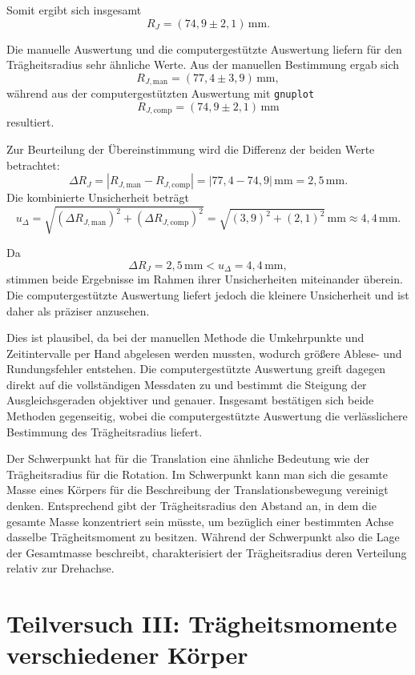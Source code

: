 \documentclass{report}
\begin{document}
\noindent
Somit ergibt sich insgesamt
\[
\boxed{R_J=(74{,}9\pm2{,}1)\,\mathrm{mm}.}
\]

\noindent
Die manuelle Auswertung und die computergestützte Auswertung liefern für den Trägheitsradius sehr ähnliche Werte. Aus der manuellen Bestimmung ergab sich
\[
R_{J,\mathrm{man}}=(77{,}4\pm3{,}9)\,\mathrm{mm},
\]
während aus der computergestützten Auswertung mit \texttt{gnuplot}
\[
R_{J,\mathrm{comp}}=(74{,}9\pm2{,}1)\,\mathrm{mm}
\]
resultiert.

\noindent
Zur Beurteilung der Übereinstimmung wird die Differenz der beiden Werte betrachtet:
\[
\Delta R_J=\left|R_{J,\mathrm{man}}-R_{J,\mathrm{comp}}\right|
=|77{,}4-74{,}9|\,\mathrm{mm}
=2{,}5\,\mathrm{mm}.
\]
Die kombinierte Unsicherheit beträgt
\[
u_{\Delta}=
\sqrt{(\Delta R_{J,\mathrm{man}})^2+(\Delta R_{J,\mathrm{comp}})^2}
=
\sqrt{(3{,}9)^2+(2{,}1)^2}\,\mathrm{mm}
\approx 4{,}4\,\mathrm{mm}.
\]

\noindent
Da
\[
\Delta R_J = 2{,}5\,\mathrm{mm} < u_{\Delta} = 4{,}4\,\mathrm{mm},
\]
stimmen beide Ergebnisse im Rahmen ihrer Unsicherheiten miteinander überein. Die computergestützte Auswertung liefert jedoch die kleinere Unsicherheit und ist daher als präziser anzusehen.

\noindent
Dies ist plausibel, da bei der manuellen Methode die Umkehrpunkte und Zeitintervalle per Hand abgelesen werden mussten, wodurch größere Ablese- und Rundungsfehler entstehen. Die computergestützte Auswertung greift dagegen direkt auf die vollständigen Messdaten zu und bestimmt die Steigung der Ausgleichsgeraden objektiver und genauer. Insgesamt bestätigen sich beide Methoden gegenseitig, wobei die computergestützte Auswertung die verlässlichere Bestimmung des Trägheitsradius liefert.

\bigskip

\noindent
Der Schwerpunkt hat für die Translation eine ähnliche Bedeutung wie der Trägheitsradius für die Rotation. Im Schwerpunkt kann man sich die gesamte Masse eines Körpers für die Beschreibung der Translationsbewegung vereinigt denken. Entsprechend gibt der Trägheitsradius den Abstand an, in dem die gesamte Masse konzentriert sein müsste, um bezüglich einer bestimmten Achse dasselbe Trägheitsmoment zu besitzen. Während der Schwerpunkt also die Lage der Gesamtmasse beschreibt, charakterisiert der Trägheitsradius deren Verteilung relativ zur Drehachse.


\newpage
\section{Teilversuch III: Trägheitsmomente verschiedener Körper}
\end{document}

